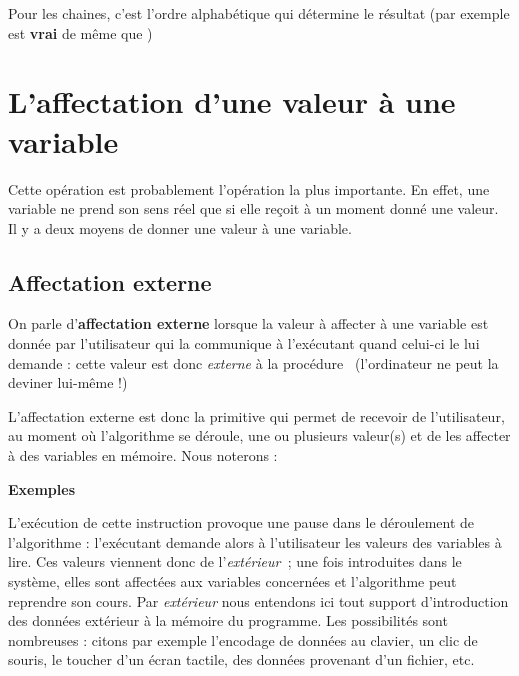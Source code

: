 			Pour les chaines, c'est l’ordre alphabétique qui
			détermine le résultat (par exemple
			 est \textbf{vrai} de même que
			\textstyleCodeInsr{${\leq}$})

	\section{L’affectation d’une valeur à une variable}

		Cette opération est probablement l’opération la plus importante. En
		effet, une variable ne prend son sens réel que si elle reçoit à un
		moment donné une valeur. Il y a deux moyens de donner une valeur à une
		variable.

		\subsection{Affectation externe }

			On parle d’\textbf{affectation externe} lorsque la valeur à affecter à
			une variable est donnée par l’utilisateur qui la communique à
			l’exécutant quand celui-ci le lui demande : cette valeur est donc
			\textit{externe} à la procédure \ (l’ordinateur ne peut la deviner
			lui-même !)

			L’affectation externe est donc la primitive qui permet de recevoir de
			l’utilisateur, au moment où l'algorithme se déroule,
			une ou plusieurs valeur(s) et de les affecter à des variables en
			mémoire. Nous noterons :

			
			{\bfseries Exemples}
			

			L’exécution de cette instruction provoque une
			pause dans le déroulement de l’algorithme : l’exécutant demande alors à
			l’utilisateur les valeurs des variables à lire. Ces valeurs viennent
			donc de l’\textit{extérieur~}; une fois introduites dans le système,
			elles sont affectées aux variables concernées et l’algorithme peut
			reprendre son cours. Par \textit{extérieur} nous entendons ici tout
			support d’introduction des données extérieur à la mémoire du programme.
			Les possibilités sont nombreuses : citons par exemple l’encodage de
			données au clavier, un clic de souris, le toucher d'un
			écran tactile, des données provenant d’un fichier, etc.

